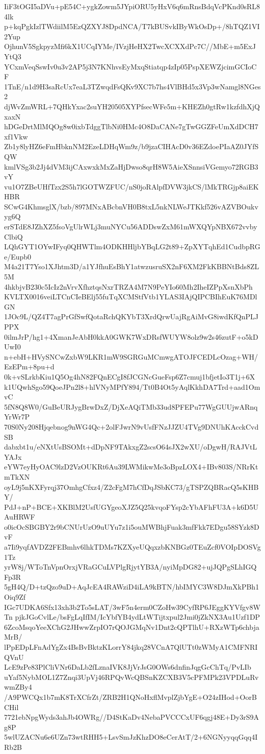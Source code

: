 IiF3tOGI5aDVu+pE54C+ygkZowm5JYpiORU5yHxV6q6mRnsBdqVcPKnd0sRL84lk
p+kqPgkIzlTWdiilM5EzQZXYJ8DpdNCA/T7kBUSvkIByWkOsDp+/8hTQZ1VI2Yup
OjhunV5SgkpyzMfi6kX1UCqIYMe/IVzjHeHX2TwcXCXXdPc7C//MbE+m5ExJYtQ3
YCxmVeqSswIv0u3v2AP5j3N7KNhvsEyMxqStiatqp4zIp05PspXEWZjcimGCIoCF
1TnE/n1d9H3saRcUx7eaL3TZwqdFsQKv9XC7b7hs4VlBHd5x3Vp3wNamgl8NGes2
djWvZmWRL+7QHkYxac2suYH20505XYPfsecWFe5m+KHEZh0gtRw1kzfdhXjQxaxN
hDGeDrtMlMQOg8w0ixbTdggTlbNi0HMc4O8DaCANe7gTwGGZFeUmXdDCH7xf1Vkw
Zb1y8lyHZ6eFmHbknNM2EzeLDHqWm9z/b9jzaCIHAcD0v36EZdoePIaAZ0JYfSQW
kmlVSg3b2Jj4dVM3ijCAxwxkMxZaHjDwso8qrH8W5AieXSnnsiVGemyo72RGB3vY
vu1O7ZBeUHfTzx2S5h7lGOTWZFUC/nS0joRAlpfDVW3jkCS/lMkTRGjp8aiEKHBR
SCwG4KhmsglX/bzb/897MNxABcbnVH0B8txL5nkNLWeJTKkf526vAZVBOukvyg6Q
erSTdE8JZhXZ5fsoVgUlrWLj3muNYCu56ADDswZxM61mWXQYpNBX672vvbyClbiQ
LQhGYT1OYwIFyq0QHWTlm4ODKHHljbYBqLG2t89+ZpXYTqhEd1CudbpRGe/Eupb0
M4a21T7Yso1XJhtm3D/a1YJfhuEsBhY1atwzusruSX2nF6XM2FkKBBNtBds8ZL5M
4hkbjvB230c5IcIz2nVrvXfhztqsNxrTRZA4M7N9PeYIo60Mh2IheIZPpXsnXbPh
KVLTX0016veiLTCnCIeBElj55fuTqXCMStfVtb1YLAS3IAjQIPCBIhEuK76MDlGN
1JOc9L/QZ4T7agPrGfSwfQotaRchQKYbT3XrdQrwUajRgAiMvG8iwdKfQnPLJPPX
0ilmJrP/hg1+4XmanJeAbH0kkA0GWK7WxDRsfWUYW8olz9w2s46zutF+o5kDUwI0
n+ebH+HVySNCwZxbW9LKR1mW9SGRGuMCmwgATOJFCEDLcOzag+WH/EzEPm+8pu+d
0k+vSLrkbKiu1Q5Og4hN82FQnECgI8fJCGNcGueFsp6Z7cmuj1bfjetIo3T1j+6X
k1UQwhSgo59QoeJPn2l8+hlVNyMPfY894/Tt0B4Ot5yAqlKkhDA7Trd+aad1OmvC
5fN8Q8W0/GuBeURJygBrwDxZ/DjXeAQiTMb33ud8PFEPu77WgGUUjwARnqYrWr7P
70S0Ny208Hjqebnog9nWG4Qc+2olFJwrN9vUsfFNzJJZU4TVg9DNUhKAcckCvdSB
dabxbt1u/eNXtUsBSOMt+dDpNF9TAkxgZ2scsO64sJX2wXU/oDgwH/RAJVtLYAJx
eYW7eyHyOAC9lzD2VzOUKRt6Au39LWMikwMe3oBpzLOX4+IBv803S/NRrKtmTkXN
oyL9j5nKXFyrqj37OmhgCfxz4/Z2cFgM7hCfDqJSbKC73/gTSPZQBRacQ5sKHBY/
PdJ+nP+BCE+XKBlM2UsfUGYgeoXJZ5Q25kvqoFYsp2cYbAFhFU3A+k6D5UAuHRWF
o0icOcSBGBY2r9bCNUrUzO9uUYu7z1i5ouMWBhjFuak3mfFkk7EDgu58SYzk8DvF
a7Ii9yqfAVDZ2FEBmhv6lhkTDMs7KZXyeUQqxzbKNBGz0TEuZcf0VOIpDOSVg1Tz
yrW8j/WToTnVpnOrxjVRaGCuLVPlgRjytYB3A/nyiMpDG82+ujJQPgSLhIGQFp3R
5gH4Q/D+tzQzo9uD+AqJcEA4RAWziD4iLA9kBTN/hbIMYC3W8DJmXkPBh1Oiq9Zf
IGc7UDKA6Sfx13xh3b2To5sLAT/3wF5n4erm0CZoHw39CyfRP6JEggKYVfgv8WTn
pjkJGoCvlLe/bsFgLqIfIM/IcYbfYB4ydLtWTijtxpul2Jmi0jZkNX3Au1Uzf1DP
6ZcoMsqoYeeXChG2JHwwZrpIO7rQOJGMqNv1Dnt2cQPTlhU+RXzWTp6chbjaMrB/
lPpEDpLFnAdYgZx4BsBvBktzKLorrY84jkq28VCnA7QlUTt0zWMyA1CMFNRIQVnU
LcE9zPe83PlCliVNr6DaLb2fLznaIVK8JjVrJsG0OWs6dnfinJqgGcChTq/PvLIb
uYaf5NybMOL1Z7Znqi3UpVj46RPQvWcQBSnKZCXB3V5cPFMPk23VPDLuRvwmZBy4
/A9PWCQx1b7mK8TrXCfrZt/ZRB2H1QNoHxflMvplZjbYgE+O24zIHod+OorBCHil
7721ebNpgWyds3ahJb4OWRg//D4StKaDv4NebaPVCCCxUF6qgj48E+Dy3rS9Ag8P
5wlUZACNu6e6UZn73wtRHH5+LsvSmJzKhzDO8eCerAtT/2+6NGNyyqqGqq4IRb2B
